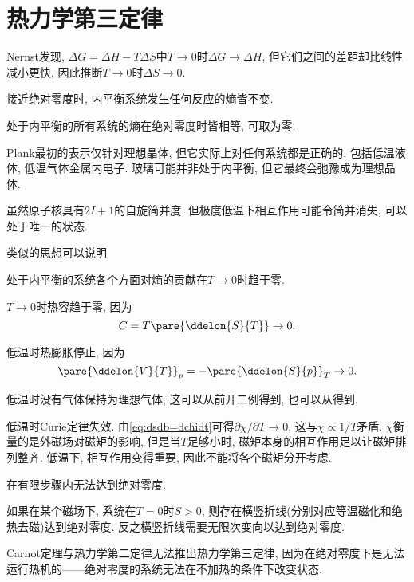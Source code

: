 \documentclass[../Thermal.tex]{subfiles}
\begin{document}
\section{热力学第三定律}
Nernst发现, $\Delta G = \Delta H - T\Delta S$中$T\rightarrow 0$时$\Delta G\rightarrow \Delta H$, 但它们之间的差距却比线性减小更快, 因此推断$T\rightarrow 0$时$\Delta S\rightarrow 0$.
\begin{finale}
\begin{axiom}[热力学第三定律]
接近绝对零度时, 内平衡系统发生任何反应的熵皆不变.
\end{axiom}
\end{finale}
\begin{corollary}[热力学第三定律]
处于内平衡的所有系统的熵在绝对零度时皆相等, 可取为零.
\end{corollary}
Plank最初的表示仅针对理想晶体, 但它实际上对任何系统都是正确的, 包括低温液体, 低温气体金属内电子. 玻璃可能并非处于内平衡, 但它最终会弛豫成为理想晶体.
\begin{remark}
虽然原子核具有$2I+1$的自旋简并度, 但极度低温下相互作用可能令简并消失, 可以处于唯一的状态.
\end{remark}
类似的思想可以说明
\begin{corollary}[热力学第三定律]
处于内平衡的系统各个方面对熵的贡献在$T\rightarrow 0$时趋于零.
\end{corollary}
\begin{ex}
$T\rightarrow 0$时热容趋于零, 因为
\[ C = T\pare{\ddelon{S}{T}}\rightarrow 0. \]
\end{ex}
\begin{ex}
低温时热膨胀停止, 因为
\[ \pare{\ddelon{V}{T}}_p = -\pare{\ddelon{S}{p}}_T\rightarrow 0. \]
\end{ex}
\begin{ex}
低温时没有气体保持为理想气体, 这可以从前开二例得到, 也可以从得到.
\end{ex}
\begin{ex}
低温时Curie定律失效. 由\eqref{eq:dsdb=dchidt}可得$\partial \chi/\partial T\rightarrow 0$, 这与$\chi\propto 1/T$矛盾. $\chi$衡量的是外磁场对磁矩的影响, 但是当$T$足够小时, 磁矩本身的相互作用足以让磁矩排列整齐. 低温下, 相互作用变得重要, 因此不能将各个磁矩分开考虑.
\end{ex}
\begin{finale}
\begin{corollary}[热力学第三定律]
在有限步骤内无法达到绝对零度.
\end{corollary}
\end{finale}
\begin{ex}
如果在某个磁场下, 系统在$T = 0$时$S>0$, 则存在横竖折线(分别对应等温磁化和绝热去磁)达到绝对零度. 反之横竖折线需要无限次变向以达到绝对零度.
\end{ex}
\begin{remark}
Carnot定理与热力学第二定律无法推出热力学第三定律, 因为在绝对零度下是无法运行热机的——绝对零度的系统无法在不加热的条件下改变状态.
\end{remark}
\end{document}
